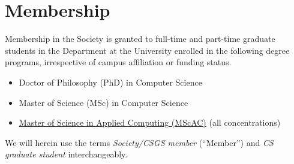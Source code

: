 \section{Membership}\label{sec:members}
Membership in the Society is granted to full-time and part-time graduate
students in the Department at the University enrolled in the following degree
programs, irrespective of campus affiliation or funding status.
\begin{itemize}
    \item Doctor of Philosophy (PhD) in Computer Science
    \item Master of Science (MSc) in Computer Science
    \item \href{https://mscac.utoronto.ca/}{Master of Science in Applied Computing (MScAC)} (all concentrations)
\end{itemize}
We will herein use the terms \textit{Society/CSGS member} (``Member'') and \textit{CS graduate student} interchangeably.